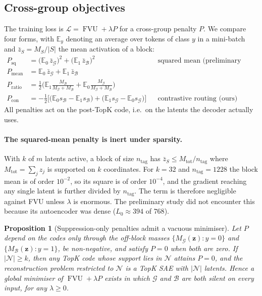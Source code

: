 \documentclass[11pt,a4paper]{article}
\newtheorem{proposition}{Proposition}
\theoremstyle{remark}
\newcommand{\E}{\mathbb{E}}
\newcommand{\z}{\mathbf{z}}
\newcommand{\Gset}{\mathcal{G}}
\newcommand{\Bset}{\mathcal{B}}
\newcommand{\Nset}{\mathcal{N}}
\newcommand{\ntag}{n_{\mathrm{tag}}}
\newcommand{\FVU}{\operatorname{FVU}}
\begin{document}
\subsection{Cross-group objectives}
\label{sec:objectives}
The training loss is $\mathcal L=\FVU+\lambda P$ for a cross-group penalty $P$. We compare four
forms, with $\E_y$ denoting an average over tokens of class $y$ in a mini-batch and
$\bar z_S=M_S/|S|$ the mean activation of a block:
\begin{align}
  P_{\mathrm{sq}}   &= \big(\E_0\,\bar z_{\Gset}\big)^2+\big(\E_1\,\bar z_{\Bset}\big)^2
      &&\text{squared mean (preliminary work)}\label{eq:psq}\\
  P_{\mathrm{mean}} &= \E_0\,\bar z_{\Gset}+\E_1\,\bar z_{\Bset}\\
  P_{\mathrm{ratio}}&= \tfrac12\Big(\E_1\tfrac{M_{\Bset}}{M_{\Gset}+M_{\Bset}}+\E_0\tfrac{M_{\Gset}}{M_{\Gset}+M_{\Bset}}\Big)\\
  P_{\mathrm{con}}  &= -\tfrac12\Big[\big(\E_0 s_{\Bset}-\E_1 s_{\Bset}\big)+\big(\E_1 s_{\Gset}-\E_0 s_{\Gset}\big)\Big]
      &&\text{contrastive routing (ours)}\label{eq:pcon}
\end{align}
All penalties act on the post-TopK code, i.e.\ on the latents the decoder actually uses.

\paragraph{The squared-mean penalty is inert under sparsity.}
With $k$ of $m$ latents active, a block of size $\ntag$ has
$\bar z_S\le M_{\mathrm{tot}}/\ntag$ where $M_{\mathrm{tot}}=\sum_j z_j$ is supported on $k$
coordinates. For $k=32$ and $\ntag=1228$ the block mean is of order $10^{-2}$, so its square is of
order $10^{-4}$, and the gradient reaching any single latent is further divided by $\ntag$. The
term is therefore negligible against FVU unless $\lambda$ is enormous. The preliminary study
did not encounter this because its autoencoder was dense ($L_0\approx394$ of $768$).

\begin{proposition}[Suppression-only penalties admit a vacuous minimiser]
\label{prop:silent}
Let $P$ depend on the codes only through the off-block masses $\{M_{\Gset}(\z):y=0\}$ and
$\{M_{\Bset}(\z):y=1\}$, be non-negative, and satisfy $P=0$ when both are zero. If
$|\Nset|\ge k$, then any TopK code whose support lies in $\Nset$ attains $P=0$, and the
reconstruction problem restricted to $\Nset$ is a TopK SAE with $|\Nset|$ latents. Hence a
global minimiser of $\FVU+\lambda P$ exists in which $\Gset$ and $\Bset$ are both silent on every
input, for any $\lambda\ge0$.
\end{proposition}
\end{document}
